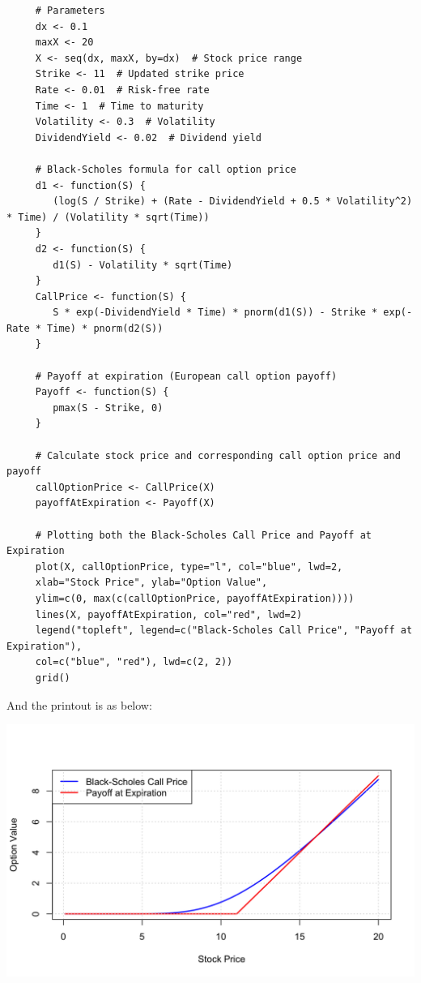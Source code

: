\documentclass[letterpaper]{article}
\begin{document}
		\begin{lstlisting}
     # Parameters
     dx <- 0.1
     maxX <- 20
     X <- seq(dx, maxX, by=dx)  # Stock price range
     Strike <- 11  # Updated strike price
     Rate <- 0.01  # Risk-free rate
     Time <- 1  # Time to maturity
     Volatility <- 0.3  # Volatility
     DividendYield <- 0.02  # Dividend yield
     
     # Black-Scholes formula for call option price
     d1 <- function(S) {
     	(log(S / Strike) + (Rate - DividendYield + 0.5 * Volatility^2) * Time) / (Volatility * sqrt(Time))
     }
     d2 <- function(S) {
     	d1(S) - Volatility * sqrt(Time)
     }
     CallPrice <- function(S) {
     	S * exp(-DividendYield * Time) * pnorm(d1(S)) - Strike * exp(-Rate * Time) * pnorm(d2(S))
     }
     
     # Payoff at expiration (European call option payoff)
     Payoff <- function(S) {
     	pmax(S - Strike, 0)
     }
     
     # Calculate stock price and corresponding call option price and payoff
     callOptionPrice <- CallPrice(X)
     payoffAtExpiration <- Payoff(X)
     
     # Plotting both the Black-Scholes Call Price and Payoff at Expiration
     plot(X, callOptionPrice, type="l", col="blue", lwd=2, 
     xlab="Stock Price", ylab="Option Value",
     ylim=c(0, max(c(callOptionPrice, payoffAtExpiration))))
     lines(X, payoffAtExpiration, col="red", lwd=2)
     legend("topleft", legend=c("Black-Scholes Call Price", "Payoff at Expiration"),
     col=c("blue", "red"), lwd=c(2, 2))
     grid()
		\end{lstlisting}
	
	And the printout is as below:
	
		\includegraphics[max width=\textwidth, center]{Q1_2}
		\pagebreak
		
\end{document}
